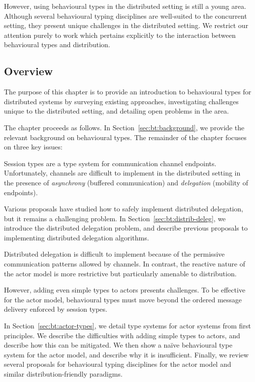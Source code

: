 \documentclass[
graybox,
envcountchap
]{svmult}
\begin{document}
\begin{bibunit}
  However, using behavioural types in the distributed setting is still a young
  area. Although several behavioural typing disciplines are well-suited to the
  concurrent setting, they present unique challenges in the distributed setting.
  We restrict our attention purely to work which pertains explicitly to the
  interaction between behavioural types and distribution.

  \subsection{Overview}

  The purpose of this chapter is to provide an introduction to behavioural types
  for distributed systems by surveying existing approaches, investigating
  challenges unique to the distributed setting, and detailing open problems in
  the area.

  The chapter proceeds as follows.  In Section~\ref{sec:bt:background}, we
  provide the relevant background on behavioural types.
  The remainder of the chapter focuses on three key issues:

      Session types are a type system for communication channel endpoints.
      Unfortunately, channels are difficult to implement in the distributed
      setting in the presence of \emph{asynchrony} (buffered communication) and
      \emph{delegation} (mobility of endpoints).

      Various proposals have studied how to safely implement distributed
      delegation, but it remains a challenging problem.
      In Section~\ref{sec:bt:distrib-deleg}, we introduce the distributed delegation
      problem, and describe previous proposals to implementing distributed
      delegation algorithms.

      Distributed delegation is difficult to implement because of the permissive
      communication patterns allowed by channels. In contrast, the reactive
      nature of the actor model is more restrictive but particularly amenable
      to distribution.

      However, adding even simple types to actors presents challenges.
      To be effective for the actor model, behavioural types must move beyond
      the ordered message delivery enforced by session types.

      In Section~\ref{sec:bt:actor-types}, we detail type systems for actor
      systems from first principles. We describe the difficulties with adding
      simple types to actors, and describe how this can be mitigated. We then
      show a na\"ive behavioural type system for the actor model, and describe
      why it is insufficient. Finally, we review several proposals for behavioural
      typing disciplines for the actor model and similar distribution-friendly
      paradigms.


\end{bibunit}
\end{document}
